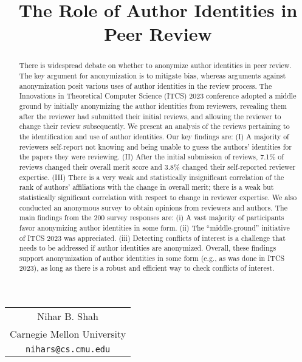\documentclass{article}
\title{The Role of Author Identities in Peer Review}
\author{}
\date{}
\newcommand{\rev}[1]{{\color{black}#1}}
\begin{document}
\maketitle
\vspace{-1.4cm}

\begin{center}
\begin{tabular}{c}
{\large Nihar B. Shah}\\
Carnegie Mellon University\\
{\tt nihars@cs.cmu.edu} \\
\end{tabular}
\end{center}

~\\

\begin{abstract}
There is widespread debate on whether to anonymize author identities in peer review. The key argument for anonymization is to mitigate bias, whereas arguments against anonymization posit various uses of author identities in the review process. The Innovations in Theoretical Computer Science (ITCS) 2023 conference adopted a middle ground by initially anonymizing the author identities from reviewers, revealing them after the reviewer had submitted their initial reviews, and allowing the reviewer to change their review subsequently. We present an analysis of the reviews pertaining to the identification and use of author identities. Our key findings are: (I) A majority of reviewers self-report not knowing and being unable to guess the authors' identities for the papers they were reviewing. (II) After the initial submission of reviews, 7.1\% of reviews changed their overall merit score and  3.8\% changed their self-reported reviewer expertise. (III) \rev{There is a very weak and statistically insignificant correlation of the rank of authors' affiliations with the change in overall merit; there is a weak but statistically significant correlation with respect to change in reviewer expertise.} We also conducted an anonymous survey to obtain opinions from reviewers and authors. The main findings from the 200 survey responses are: (i) A vast majority of participants favor anonymizing author identities in some form. (ii) The ``middle-ground'' initiative of ITCS 2023 was appreciated. (iii) Detecting conflicts of interest is a challenge that needs to be addressed if author identities are anonymized.  Overall, these findings support anonymization of author identities in some form (e.g., as was done in ITCS 2023), as long as there is a robust and efficient way to check conflicts of interest.
\end{abstract}
\end{document}
